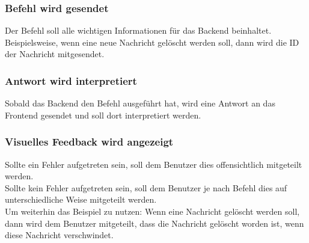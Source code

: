 \subsubsection{Befehl wird gesendet}
Der Befehl soll alle wichtigen Informationen für das Backend beinhaltet. Beispielsweise, wenn eine neue Nachricht gelöscht werden soll, dann wird die ID der Nachricht mitgesendet.

\subsubsection{Antwort wird interpretiert}
Sobald das Backend den Befehl ausgeführt hat, wird eine Antwort an das Frontend gesendet und soll dort interpretiert werden.

\subsubsection{Visuelles Feedback wird angezeigt}
Sollte ein Fehler aufgetreten sein, soll dem Benutzer dies offensichtlich mitgeteilt werden.\\
Sollte kein Fehler aufgetreten sein, soll dem Benutzer je nach Befehl dies auf unterschiedliche Weise mitgeteilt werden.\\
Um weiterhin das Beispiel zu nutzen: Wenn eine Nachricht gelöscht werden soll, dann wird dem Benutzer mitgeteilt, dass die Nachricht gelöscht worden ist, wenn diese Nachricht verschwindet.